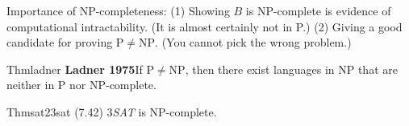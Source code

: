
Importance of NP-completeness: (1) Showing $B$ is NP-complete is evidence of computational intractability. (It is almost certainly not in P.) (2) Giving a good candidate for proving $\mathrm{P}\neq \mathrm{NP}$. (You cannot pick the wrong problem.)

\begin{reference}{Thm}{ladner}
  \textbf{Ladner 1975}\quad If $\mathrm{P}\neq \mathrm{NP}$, then there exist languages in NP that are neither in P nor NP-complete.
\end{reference}

\begin{reference}{Thm}{sat23sat}
  (7.42) 3\textit{SAT} is NP-complete.
\end{reference}


